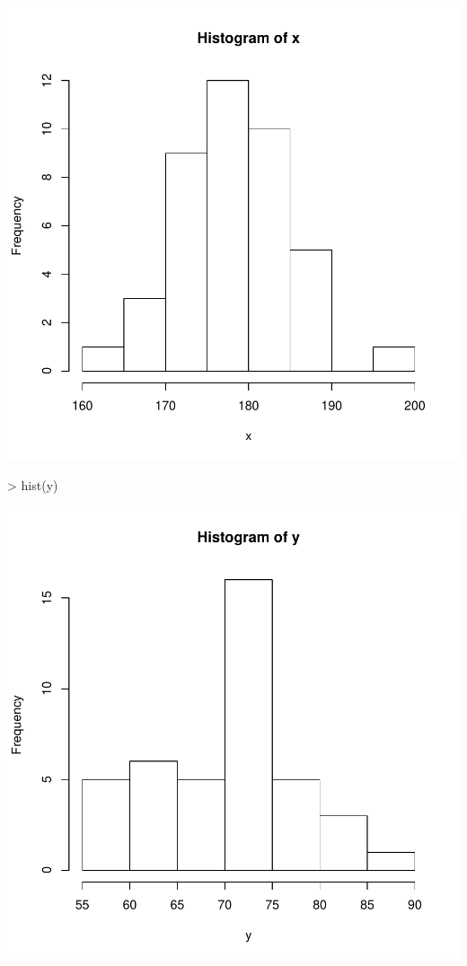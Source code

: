 \documentclass[12pt]{article}
\begin{document}
\includegraphics{ensayo-011}
\begin{Schunk}
\begin{Sinput}
> hist(y)
\end{Sinput}
\end{Schunk}
\includegraphics{ensayo-012}
\end{document}
